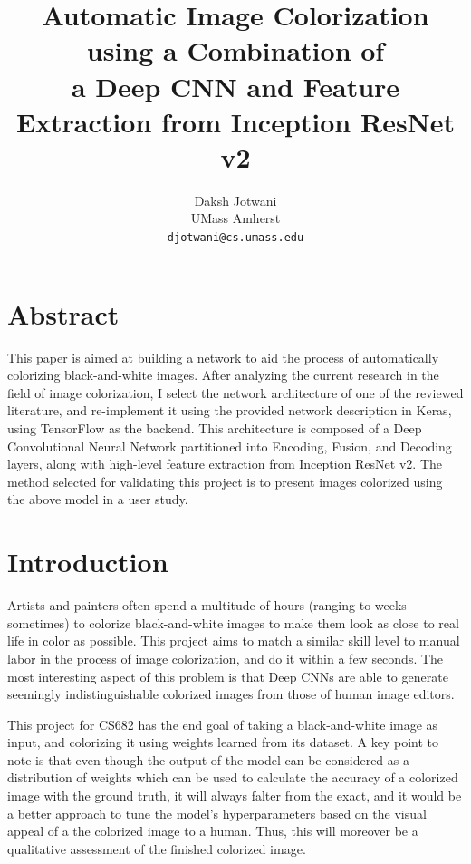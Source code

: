 \documentclass[10pt,twocolumn,letterpaper]{article}
\begin{document}
	\title{Automatic Image Colorization using a Combination of\\
	a Deep CNN and Feature Extraction from Inception ResNet v2}

	\author{Daksh Jotwani\\
	UMass Amherst\\
	{\tt\small djotwani@cs.umass.edu}
	}

	\maketitle

	\section{Abstract}
	This paper is aimed at building a network to aid the process of automatically colorizing black-and-white images. After analyzing the current research in the field of image colorization, I select the network architecture of one of the reviewed literature, and re-implement it using the provided network description in Keras, using TensorFlow as the backend. This architecture is composed of a Deep Convolutional Neural Network partitioned into Encoding, Fusion, and Decoding layers, along with high-level feature extraction from Inception ResNet v2. The method selected for validating this project is to present images colorized using the above model in a user study.

	\section{Introduction}
	Artists and painters often spend a multitude of hours (ranging to weeks sometimes) to colorize black-and-white images to make them look as close to real life in color as possible. This project aims to match a similar skill level to manual labor in the process of image colorization, and do it within a few seconds. The most interesting aspect of this problem is that Deep CNNs are able to generate seemingly indistinguishable colorized images from those of human image editors.

	This project for CS682 has the end goal of taking a black-and-white image as input, and colorizing it using weights learned from its dataset. A key point to note is that even though the output of the model can be considered as a distribution of weights which can be used to calculate the accuracy of a colorized image with the ground truth, it will always falter from the exact, and it would be a better approach to tune the model's hyperparameters based on the visual appeal of a the colorized image to a human. Thus, this will moreover be a qualitative assessment of the finished colorized image.
\end{document}

